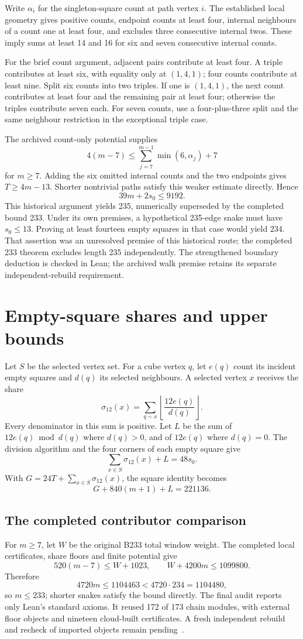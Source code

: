 \documentclass[11pt,a4paper]{article}
\begin{document}
Write $\alpha_i$ for the singleton-square count at path vertex $i$.
The established local geometry gives positive counts, endpoint counts
at least four, internal neighbours of a count one at least four, and
excludes three consecutive internal twos. These imply sums at least
14 and 16 for six and seven consecutive internal counts.

For the brief count argument, adjacent pairs contribute at least four.
A triple contributes at least six, with equality only at $(1,4,1)$;
four counts contribute at least nine. Split six counts into two triples.
If one is $(1,4,1)$, the next count contributes at least four and the
remaining pair at least four; otherwise the triples contribute seven
each. For seven counts, use a four-plus-three split and the same
neighbour restriction in the exceptional triple case.

The archived count-only potential supplies
\[
4(m-7)\le\sum_{j=7}^{m-1}\min(6,\alpha_j)+7
\]
for $m\ge7$. Adding the six omitted internal counts and the two endpoints
gives $T\ge4m-13$. Shorter nontrivial paths satisfy this weaker estimate
directly. Hence
\[
\boxed{39m+2s_0\le9192.}
\]
This historical argument yields 235, numerically superseded by the
completed bound 233. Under its own premises, a hypothetical 235-edge
snake must have $s_0\le13$.
Proving at least fourteen empty squares in that case would yield 234.
That assertion was an unresolved premise of this historical route; the
completed 233 theorem excludes length 235 independently. The strengthened boundary deduction
is checked in Lean; the archived walk premise retains its separate
independent-rebuild requirement.

\section{Empty-square shares and upper bounds}
Let $S$ be the selected vertex set. For a cube vertex $q$, let $e(q)$ count its incident empty squares and
$d(q)$ its selected neighbours. A selected vertex $x$ receives the share
\[
\sigma_{12}(x)=\sum_{q\sim x}
 \left\lfloor\frac{12e(q)}{d(q)}\right\rfloor.
\]
Every denominator in this sum is positive. Let $L$ be the sum of
$12e(q)\bmod d(q)$ where $d(q)>0$, and of $12e(q)$ where $d(q)=0$.
The division algorithm and the four corners of each empty square give
\[
\sum_{x\in S}\sigma_{12}(x)+L=48s_0.
\]
With $G=24T+\sum_{x\in S}\sigma_{12}(x)$, the square identity becomes
\[
G+840(m+1)+L=221136.
\]

\subsection{The completed contributor comparison}
For $m\ge7$, let $W$ be the original B233 total window weight. The completed
local certificates, share floors and finite potential give
\[
520(m-7)\le W+1023,\qquad W+4200m\le1099800.
\]
Therefore
\[
4720m\le1104463<4720\cdot234=1104480,
\]
so $m\le233$; shorter snakes satisfy the bound directly.
The final audit reports only Lean's standard axioms. It reused 172 of 173
chain modules, with external floor objects and nineteen cloud-built
certificates. A fresh independent rebuild and recheck of imported objects
remain pending~\cite{bound233archive}.
\end{document}
